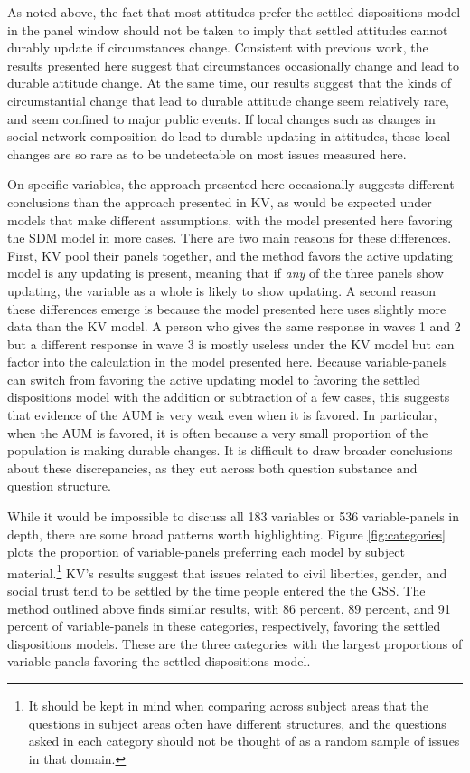 \documentclass[
  11pt,
]{article}
\begin{document}
As noted above, the fact that most attitudes prefer the settled dispositions model in the panel window should not be taken to imply that settled attitudes cannot durably update if circumstances change. Consistent with previous work, the results presented here suggest that circumstances occasionally change and lead to durable attitude change. At the same time, our results suggest that the kinds of circumstantial change that lead to durable attitude change seem relatively rare, and seem confined to major public events. If local changes such as changes in social network composition do lead to durable updating in attitudes, these local changes are so rare as to be undetectable on most issues measured here.

On specific variables, the approach presented here occasionally suggests different conclusions than the approach presented in KV, as would be expected under models that make different assumptions, with the model presented here favoring the SDM model in more cases. There are two main reasons for these differences. First, KV pool their panels together, and the method favors the active updating model is any updating is present, meaning that if \emph{any} of the three panels show updating, the variable as a whole is likely to show updating. A second reason these differences emerge is because the model presented here uses slightly more data than the KV model. A person who gives the same response in waves 1 and 2 but a different response in wave 3 is mostly useless under the KV model but can factor into the calculation in the model presented here. Because variable-panels can switch from favoring the active updating model to favoring the settled dispositions model with the addition or subtraction of a few cases, this suggests that evidence of the AUM is very weak even when it is favored. In particular, when the AUM is favored, it is often because a very small proportion of the population is making durable changes. It is difficult to draw broader conclusions about these discrepancies, as they cut across both question substance and question structure.

While it would be impossible to discuss all 183 variables or 536 variable-panels in depth, there are some broad patterns worth highlighting. Figure \ref{fig:categories} plots the proportion of variable-panels preferring each model by subject material.\footnote{It should be kept in mind when comparing across subject areas that the questions in subject areas often have different structures, and the questions asked in each category should not be thought of as a random sample of issues in that domain.} KV's results suggest that issues related to civil liberties, gender, and social trust tend to be settled by the time people entered the the GSS. The method outlined above finds similar results, with 86 percent, 89 percent, and 91 percent of variable-panels in these categories, respectively, favoring the settled dispositions models. These are the three categories with the largest proportions of variable-panels favoring the settled dispositions model.
\end{document}

